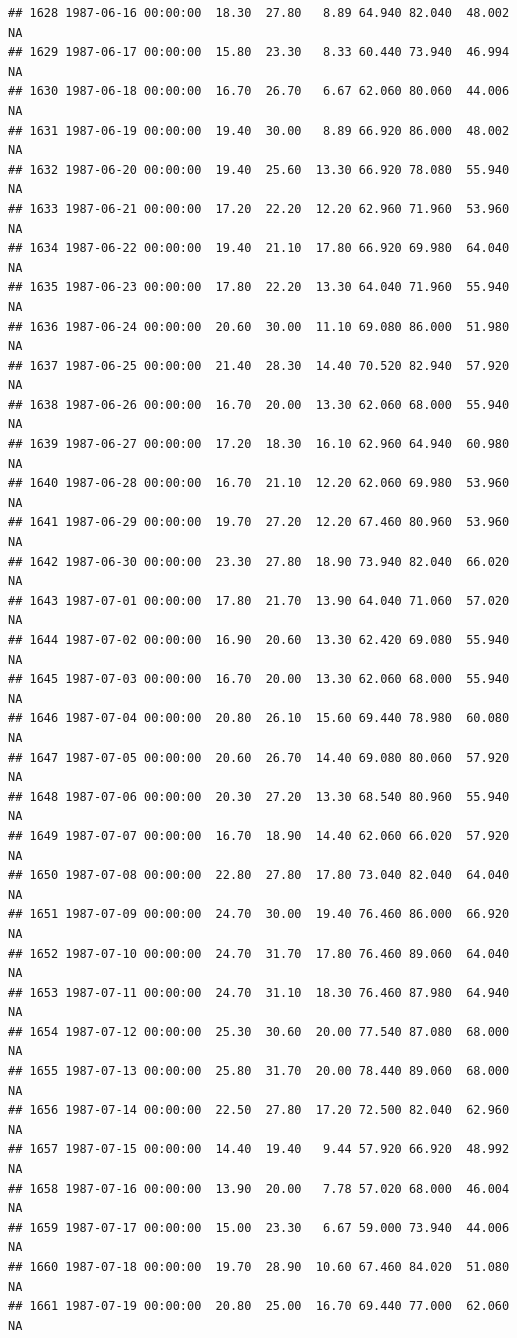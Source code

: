 \documentclass{article}\usepackage{graphicx, color}
\makeatletter
\newenvironment{kframe}{%
 \def\at@end@of@kframe{}%
 \ifinner\ifhmode%
  \def\at@end@of@kframe{\end{minipage}}%
  \begin{minipage}{\columnwidth}%
 \fi\fi%
 \def\FrameCommand##1{\hskip\@totalleftmargin \hskip-\fboxsep
 \colorbox{shadecolor}{##1}\hskip-\fboxsep
     \hskip-\linewidth \hskip-\@totalleftmargin \hskip\columnwidth}%
 \MakeFramed {\advance\hsize-\width
   \@totalleftmargin\z@ \linewidth\hsize
   \@setminipage}}%
 {\par\unskip\endMakeFramed%
 \at@end@of@kframe}
\newenvironment{knitrout}{}{} %
\makeatother
\begin{document}
\begin{knitrout}
\begin{kframe}
\begin{verbatim}
## 1628 1987-06-16 00:00:00  18.30  27.80   8.89 64.940 82.040  48.002     NA
## 1629 1987-06-17 00:00:00  15.80  23.30   8.33 60.440 73.940  46.994     NA
## 1630 1987-06-18 00:00:00  16.70  26.70   6.67 62.060 80.060  44.006     NA
## 1631 1987-06-19 00:00:00  19.40  30.00   8.89 66.920 86.000  48.002     NA
## 1632 1987-06-20 00:00:00  19.40  25.60  13.30 66.920 78.080  55.940     NA
## 1633 1987-06-21 00:00:00  17.20  22.20  12.20 62.960 71.960  53.960     NA
## 1634 1987-06-22 00:00:00  19.40  21.10  17.80 66.920 69.980  64.040     NA
## 1635 1987-06-23 00:00:00  17.80  22.20  13.30 64.040 71.960  55.940     NA
## 1636 1987-06-24 00:00:00  20.60  30.00  11.10 69.080 86.000  51.980     NA
## 1637 1987-06-25 00:00:00  21.40  28.30  14.40 70.520 82.940  57.920     NA
## 1638 1987-06-26 00:00:00  16.70  20.00  13.30 62.060 68.000  55.940     NA
## 1639 1987-06-27 00:00:00  17.20  18.30  16.10 62.960 64.940  60.980     NA
## 1640 1987-06-28 00:00:00  16.70  21.10  12.20 62.060 69.980  53.960     NA
## 1641 1987-06-29 00:00:00  19.70  27.20  12.20 67.460 80.960  53.960     NA
## 1642 1987-06-30 00:00:00  23.30  27.80  18.90 73.940 82.040  66.020     NA
## 1643 1987-07-01 00:00:00  17.80  21.70  13.90 64.040 71.060  57.020     NA
## 1644 1987-07-02 00:00:00  16.90  20.60  13.30 62.420 69.080  55.940     NA
## 1645 1987-07-03 00:00:00  16.70  20.00  13.30 62.060 68.000  55.940     NA
## 1646 1987-07-04 00:00:00  20.80  26.10  15.60 69.440 78.980  60.080     NA
## 1647 1987-07-05 00:00:00  20.60  26.70  14.40 69.080 80.060  57.920     NA
## 1648 1987-07-06 00:00:00  20.30  27.20  13.30 68.540 80.960  55.940     NA
## 1649 1987-07-07 00:00:00  16.70  18.90  14.40 62.060 66.020  57.920     NA
## 1650 1987-07-08 00:00:00  22.80  27.80  17.80 73.040 82.040  64.040     NA
## 1651 1987-07-09 00:00:00  24.70  30.00  19.40 76.460 86.000  66.920     NA
## 1652 1987-07-10 00:00:00  24.70  31.70  17.80 76.460 89.060  64.040     NA
## 1653 1987-07-11 00:00:00  24.70  31.10  18.30 76.460 87.980  64.940     NA
## 1654 1987-07-12 00:00:00  25.30  30.60  20.00 77.540 87.080  68.000     NA
## 1655 1987-07-13 00:00:00  25.80  31.70  20.00 78.440 89.060  68.000     NA
## 1656 1987-07-14 00:00:00  22.50  27.80  17.20 72.500 82.040  62.960     NA
## 1657 1987-07-15 00:00:00  14.40  19.40   9.44 57.920 66.920  48.992     NA
## 1658 1987-07-16 00:00:00  13.90  20.00   7.78 57.020 68.000  46.004     NA
## 1659 1987-07-17 00:00:00  15.00  23.30   6.67 59.000 73.940  44.006     NA
## 1660 1987-07-18 00:00:00  19.70  28.90  10.60 67.460 84.020  51.080     NA
## 1661 1987-07-19 00:00:00  20.80  25.00  16.70 69.440 77.000  62.060     NA

\end{verbatim}
\end{kframe}
\end{knitrout}
\end{document}
